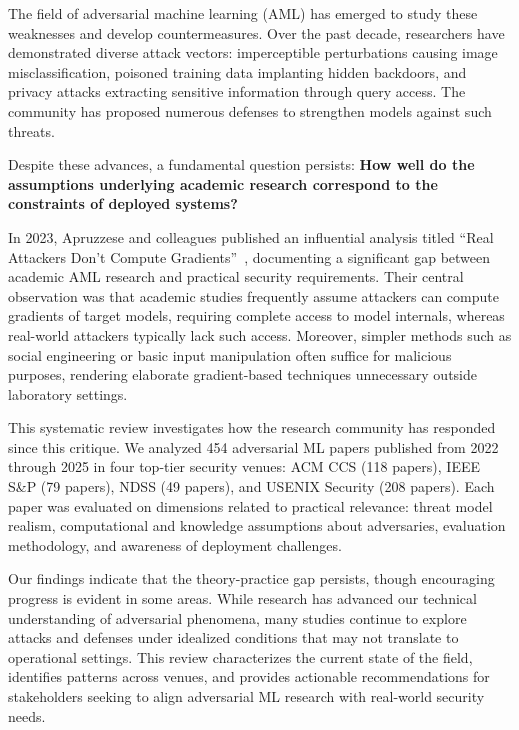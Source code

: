 \documentclass[11pt,a4paper]{article}
\begin{document}
The field of adversarial machine learning (AML) has emerged to study these weaknesses and develop countermeasures. Over the past decade, researchers have demonstrated diverse attack vectors: imperceptible perturbations causing image misclassification, poisoned training data implanting hidden backdoors, and privacy attacks extracting sensitive information through query access. The community has proposed numerous defenses to strengthen models against such threats.

Despite these advances, a fundamental question persists: \textbf{How well do the assumptions underlying academic research correspond to the constraints of deployed systems?}

In 2023, Apruzzese and colleagues published an influential analysis titled ``Real Attackers Don't Compute Gradients''~\citep{apruzzese2022real}, documenting a significant gap between academic AML research and practical security requirements. Their central observation was that academic studies frequently assume attackers can compute gradients of target models, requiring complete access to model internals, whereas real-world attackers typically lack such access. Moreover, simpler methods such as social engineering or basic input manipulation often suffice for malicious purposes, rendering elaborate gradient-based techniques unnecessary outside laboratory settings.

This systematic review investigates how the research community has responded since this critique. We analyzed 454 adversarial ML papers published from 2022 through 2025 in four top-tier security venues: ACM CCS (118 papers), IEEE S\&P (79 papers), NDSS (49 papers), and USENIX Security (208 papers). Each paper was evaluated on dimensions related to practical relevance: threat model realism, computational and knowledge assumptions about adversaries, evaluation methodology, and awareness of deployment challenges.

Our findings indicate that the theory-practice gap persists, though encouraging progress is evident in some areas. While research has advanced our technical understanding of adversarial phenomena, many studies continue to explore attacks and defenses under idealized conditions that may not translate to operational settings. This review characterizes the current state of the field, identifies patterns across venues, and provides actionable recommendations for stakeholders seeking to align adversarial ML research with real-world security needs.

\end{document}

